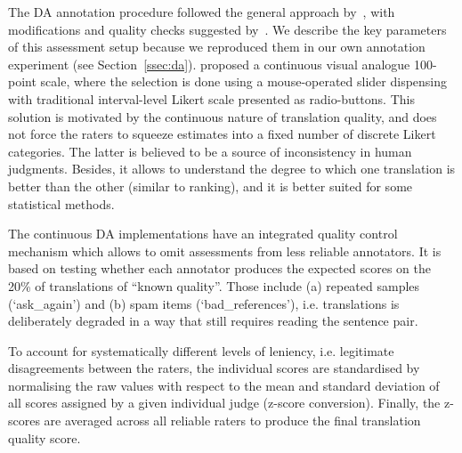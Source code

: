 The DA annotation procedure followed the general approach by~\citet{Graham2013}, with modifications and quality checks suggested by~\citet{Guzman2019}. 
We describe the key parameters of this assessment setup because we reproduced them in our own annotation experiment (see Section~\ref{ssec:da}). 
\citet{Graham2013} proposed a continuous visual analogue 100-point scale, where the selection is done using a mouse-operated slider dispensing with traditional interval-level Likert scale presented as radio-buttons. 
This solution is motivated by the continuous nature of translation quality, and does not force the raters to squeeze estimates into a fixed number of discrete Likert categories. The latter is believed to be a source of inconsistency in human judgments. 
Besides, it allows to understand the degree to which one translation is better than the other (similar to ranking), and it is better suited for some statistical methods. 

The continuous DA implementations have an integrated quality control mechanism which allows to omit assessments from less reliable annotators. It is based on testing whether each annotator produces the expected scores on the 20\% of translations of ``known quality''. Those include (a) repeated samples (`ask\_again') and (b) spam items (`bad\_references'), i.e. translations is deliberately degraded in a way that still requires reading the sentence pair. 

To account for systematically different levels of leniency, i.e. legitimate disagreements between the raters, the individual scores are standardised by normalising the raw values with respect to the mean and standard deviation of all scores assigned by a given individual judge (z-score conversion). Finally, the z-scores are averaged across all reliable raters to produce the final translation quality score.   

